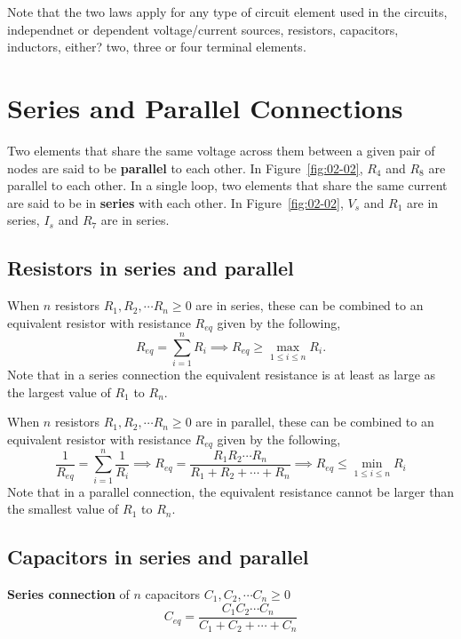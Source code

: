 Note that the two laws apply for any type of circuit element used in the circuits, independnet or dependent voltage/current sources, resistors, capacitors, inductors, either? two, three or four terminal elements.

\section{Series and Parallel Connections}
Two elements that share the same voltage across them between a given pair of nodes are said to be \textbf{parallel} to each other. In Figure~\ref{fig:02-02}, $R_4$ and $R_8$ are parallel to each other. In a single loop, two elements that share the same current are said to be in \textbf{series} with each other. In Figure~\ref{fig:02-02}, $V_s$ and $R_1$ are in series, $I_s$ and $R_7$ are in series.

\subsection{Resistors in series and parallel}
When $n$ resistors $R_1, R_2, \cdots R_n \geq 0$ are in series, these can be combined to an equivalent resistor with resistance $R_{eq}$ given by the following,
\begin{equation}
    R_{eq} = \sum_{i=1}^{n} R_i \implies R_{eq} \geq \max_{1 \leq i \leq n} R_i.
    \label{eq:02-13}
\end{equation}
Note that in a series connection the equivalent resistance is at least as large as the largest value of $R_1$ to $R_n$.

When $n$ resistors $R_1, R_2, \cdots R_n \geq 0$ are in parallel, these can be combined to an equivalent resistor with resistance $R_{eq}$ given by the following,
\begin{equation}
    \frac{1}{R_{eq}} = \sum_{i=1}^{n} \frac{1}{R_i} \implies R_{eq} = \frac{R_1R_2\cdots R_n}{R_1 + R_2 + \cdots + R_n} \implies R_{eq} \leq \min_{1 \leq i \leq n} R_i
    \label{eq:02-14}
\end{equation}
Note that in a parallel connection, the equivalent resistance cannot be larger than the smallest value of $R_1$ to $R_n$.

\subsection{Capacitors in series and parallel}
\noindent\textbf{Series connection} of $n$ capacitors $C_1, C_2, \cdots C_n \geq 0$
\begin{equation}
    C_{eq} = \frac{C_1C_2\cdots C_n}{C_1 + C_2 + \cdots + C_n}
    \label{eq:02-15}
\end{equation}


